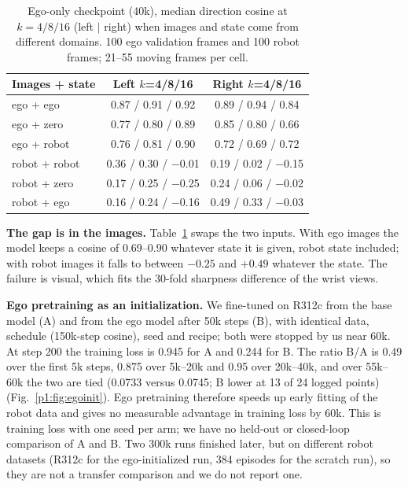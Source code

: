 \documentclass[conference,10pt]{IEEEtran}
\begin{document}
\begin{table}[t]
\centering\footnotesize\setlength{\tabcolsep}{3.2pt}
\caption{Ego-only checkpoint (40k), median direction cosine at $k{=}4/8/16$ (left $|$ right) when images and state come from
different domains. 100 ego validation frames and 100 robot frames; 21--55 moving frames per cell.}
\label{p1:tab:ablation}
\begin{tabular}{@{}lcc@{}}
\toprule
Images + state & Left $k$=4/8/16 & Right $k$=4/8/16 \\
\midrule
ego + ego & 0.87 / 0.91 / 0.92 & 0.89 / 0.94 / 0.84 \\
ego + zero & 0.77 / 0.80 / 0.89 & 0.85 / 0.80 / 0.66 \\
ego + robot & 0.76 / 0.81 / 0.90 & 0.72 / 0.69 / 0.72 \\
robot + robot & 0.36 / 0.30 / $-$0.01 & 0.19 / 0.02 / $-$0.15 \\
robot + zero & 0.17 / 0.25 / $-$0.25 & 0.24 / 0.06 / $-$0.02 \\
robot + ego & 0.16 / 0.24 / $-$0.16 & 0.49 / 0.33 / $-$0.03 \\
\bottomrule
\end{tabular}
\end{table}

\textbf{The gap is in the images.} Table~\ref{p1:tab:ablation} swaps the two inputs. With ego images the model keeps a cosine of
0.69--0.90 whatever state it is given, robot state included; with robot images it falls to between $-0.25$ and $+0.49$ whatever
the state. The failure is visual, which fits the 30-fold sharpness difference of the wrist views.

\textbf{Ego pretraining as an initialization.} We fine-tuned on R312c from the base model (A) and from the ego model after 50k
steps (B), with identical data, schedule (150k-step cosine), seed and recipe; both were stopped by us near 60k. At step 200 the
training loss is 0.945 for A and 0.244 for B. The ratio B/A is 0.49 over the first 5k steps, 0.875 over 5k--20k and 0.95 over
20k--40k, and over 55k--60k the two are tied (0.0733 versus 0.0745; B lower at 13 of 24 logged points)
(Fig.~\ref{p1:fig:egoinit}). Ego pretraining therefore speeds up early fitting of the robot data and gives no measurable advantage
in training loss by 60k. This is training loss with one seed per arm; we have no held-out or closed-loop comparison of A and B.
Two 300k runs finished later, but on different robot datasets (R312c for the ego-initialized run, 384 episodes for the
scratch run), so they are not a transfer comparison and we do not report one.
\end{document}
